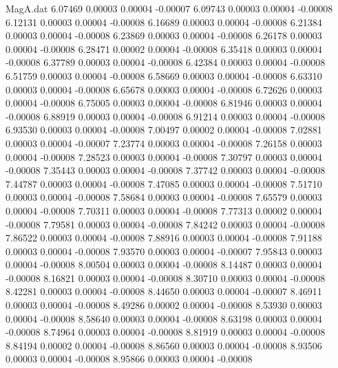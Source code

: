 \begin{filecontents}{MagA.dat}
   6.07469    0.00003    0.00004   -0.00007
   6.09743    0.00003    0.00004   -0.00008
   6.12131    0.00003    0.00004   -0.00008
   6.16689    0.00003    0.00004   -0.00008
   6.21384    0.00003    0.00004   -0.00008
   6.23869    0.00003    0.00004   -0.00008
   6.26178    0.00003    0.00004   -0.00008
   6.28471    0.00002    0.00004   -0.00008
   6.35418    0.00003    0.00004   -0.00008
   6.37789    0.00003    0.00004   -0.00008
   6.42384    0.00003    0.00004   -0.00008
   6.51759    0.00003    0.00004   -0.00008
   6.58669    0.00003    0.00004   -0.00008
   6.63310    0.00003    0.00004   -0.00008
   6.65678    0.00003    0.00004   -0.00008
   6.72626    0.00003    0.00004   -0.00008
   6.75005    0.00003    0.00004   -0.00008
   6.81946    0.00003    0.00004   -0.00008
   6.88919    0.00003    0.00004   -0.00008
   6.91214    0.00003    0.00004   -0.00008
   6.93530    0.00003    0.00004   -0.00008
   7.00497    0.00002    0.00004   -0.00008
   7.02881    0.00003    0.00004   -0.00007
   7.23774    0.00003    0.00004   -0.00008
   7.26158    0.00003    0.00004   -0.00008
   7.28523    0.00003    0.00004   -0.00008
   7.30797    0.00003    0.00004   -0.00008
   7.35443    0.00003    0.00004   -0.00008
   7.37742    0.00003    0.00004   -0.00008
   7.44787    0.00003    0.00004   -0.00008
   7.47085    0.00003    0.00004   -0.00008
   7.51710    0.00003    0.00004   -0.00008
   7.58684    0.00003    0.00004   -0.00008
   7.65579    0.00003    0.00004   -0.00008
   7.70311    0.00003    0.00004   -0.00008
   7.77313    0.00002    0.00004   -0.00008
   7.79581    0.00003    0.00004   -0.00008
   7.84242    0.00003    0.00004   -0.00008
   7.86522    0.00003    0.00004   -0.00008
   7.88916    0.00003    0.00004   -0.00008
   7.91188    0.00003    0.00004   -0.00008
   7.93570    0.00003    0.00004   -0.00007
   7.95843    0.00003    0.00004   -0.00008
   8.00504    0.00003    0.00004   -0.00008
   8.14487    0.00003    0.00004   -0.00008
   8.16821    0.00003    0.00004   -0.00008
   8.30710    0.00003    0.00004   -0.00008
   8.42281    0.00003    0.00004   -0.00008
   8.44650    0.00003    0.00004   -0.00007
   8.46911    0.00003    0.00004   -0.00008
   8.49286    0.00002    0.00004   -0.00008
   8.53930    0.00003    0.00004   -0.00008
   8.58640    0.00003    0.00004   -0.00008
   8.63198    0.00003    0.00004   -0.00008
   8.74964    0.00003    0.00004   -0.00008
   8.81919    0.00003    0.00004   -0.00008
   8.84194    0.00002    0.00004   -0.00008
   8.86560    0.00003    0.00004   -0.00008
   8.93506    0.00003    0.00004   -0.00008
   8.95866    0.00003    0.00004   -0.00008

\end{filecontents}
